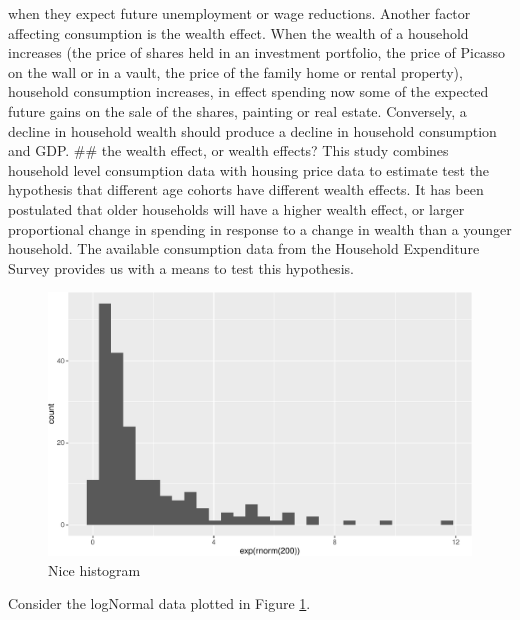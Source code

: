 \documentclass[12pt,a4paper,]{article}
\begin{document}
when they expect future unemployment or wage reductions. Another factor
affecting consumption is the wealth effect. When the wealth of a
household increases (the price of shares held in an investment
portfolio, the price of Picasso on the wall or in a vault, the price of
the family home or rental property), household consumption increases, in
effect spending now some of the expected future gains on the sale of the
shares, painting or real estate. Conversely, a decline in household
wealth should produce a decline in household consumption and GDP. \#\#
the wealth effect, or wealth effects? This study combines household
level consumption data with housing price data to estimate test the
hypothesis that different age cohorts have different wealth effects. It
has been postulated that older households will have a higher wealth
effect, or larger proportional change in spending in response to a
change in wealth than a younger household. The available consumption
data from the Household Expenditure Survey provides us with a means to
test this hypothesis.

\begin{figure}
\centering
\includegraphics{Monashwp-rmd-template_files/figure-latex/histogram-1.pdf}
\caption{\label{fig:histogram}Nice histogram}
\end{figure}

Consider the logNormal data plotted in Figure \ref{fig:histogram}.

\printbibliography
\end{document}
